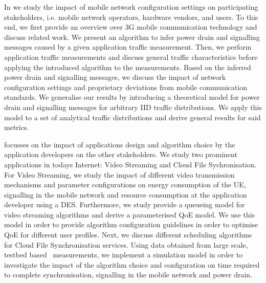 In  we study the impact of mobile network configuration settings on participating stakeholders, i.e. mobile network operators, hardware vendors, and users.
To this end, we first provide an overview over \gls{3G} mobile communication technology and discuss related work.
We present an algorithm to infer power drain and signalling messages caused by a given application traffic measurement.
Then, we perform application traffic measurements and discuss general traffic characteristics before applying the introduced algorithm to the measurements.
Based on the inferred power drain and signalling messages, we discuss the impact of network configuration settings and proprietary deviations from mobile communication standards.
We generalise our results by introducing a theoretical model for power drain and signalling messages for arbitrary \gls{IID} traffic distributions.
We apply this model to a set of analytical traffic distributions and derive general results for said metrics. 

 focusses on the impact of applications design and algorithm choice by the application developers on the other stakeholders.
We study two prominent applications in todays Internet: Video Streaming and Cloud File Sychronisation.
For Video Streaming, we study the impact of different video transmission mechanisms and parameter configurations on energy consumption of the \gls{UE}, signalling in the mobile network and resource consumption at the application developer using a \gls{DES}.
Furthermore, we study provide a queueing model for video streaming algorithms and derive a parameterised \gls{QoE} model.
We use this model in order to provide algorithm configuration guidelines in order to optimise \gls{QoE} for different user profiles.
Next, we discuss different scheduling algorithms for Cloud File Synchronisation services.
Using data obtained from large scale, testbed based~\cite{PlanetLab} measurements, we implement a simulation model in order to investigate the impact of the algorithm choice and configuration on time required to complete synchronisation, signalling in the mobile network and power drain.  

